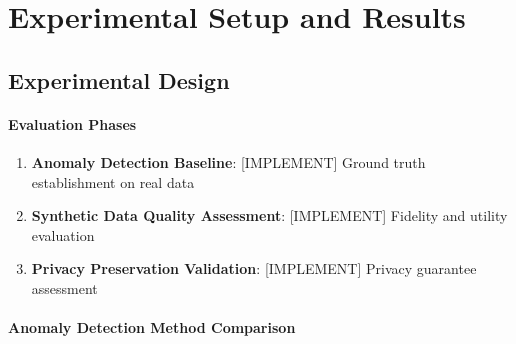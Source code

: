 \documentclass[runningheads]{llncs}
\begin{document}

\section{Experimental Setup and Results}
\label{sec:evaluation}


\subsection{Experimental Design}
\label{sec:exp-design}


\paragraph{Evaluation Phases}

\begin{enumerate}
\item \textbf{Anomaly Detection Baseline}: [IMPLEMENT] Ground truth establishment on real data

\item \textbf{Synthetic Data Quality Assessment}: [IMPLEMENT] Fidelity and utility evaluation

\item \textbf{Privacy Preservation Validation}: [IMPLEMENT] Privacy guarantee assessment
\end{enumerate}

\paragraph{Anomaly Detection Method Comparison}
\end{document}
